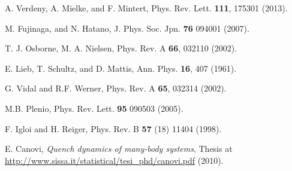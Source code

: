 \documentclass[a4paper,10pt]{article}
\begin{document}
\begin{thebibliography}{10}
A. Verdeny, A. Mielke, and F. Mintert, Phys. Rev. Lett. {\bf 111}, 175301 (2013).

M. Fujinaga, and N. Hatano, J. Phys. Soc. Jpn. {\bf 76} 094001 (2007).

T. J. Osborne, M. A. Nielsen, Phys. Rev. A {\bf 66}, 032110 (2002).

E. Lieb, T. Schultz, and D. Mattis, Ann. Phys. {\bf 16}, 407 (1961).

G. Vidal and R.F. Werner, Phys. Rev. A {\bf 65}, 032314 (2002).

M.B. Plenio, Phys. Rev. Lett. {\bf 95} 090503 (2005).

F. Igloi and H. Reiger, Phys. Rev. B {\bf 57} (18) 11404 (1998).

E. Canovi, \textit{Quench dynamics of many-body systems}, Thesis at \url{http://www.sissa.it/statistical/tesi_phd/canovi.pdf} (2010).
\end{thebibliography}
\end{document}
